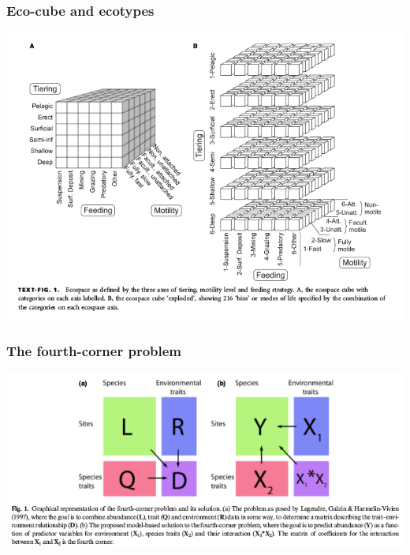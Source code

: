 \documentclass{beamer}
\begin{document}
\begin{frame}
  \frametitle{Eco-cube and ecotypes}
  \begin{center}
    \includegraphics[height=0.8\textheight,width=\textwidth,keepaspectratio=true]{figure/ecocube}
  \end{center}

\end{frame}

\begin{frame}
  \frametitle{The fourth-corner problem}
  \begin{center}
    \includegraphics[height=0.8\textheight,width=\textwidth,keepaspectratio=true]{figure/warton_fourth_corner}
  \end{center}

\end{frame}
\end{document}
